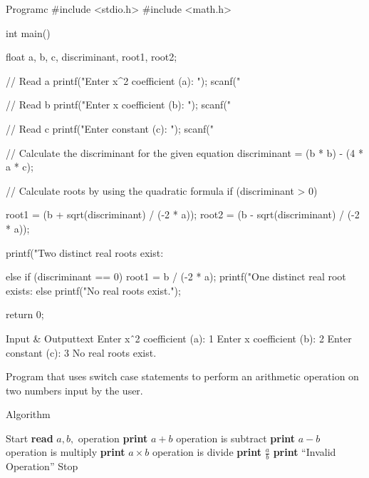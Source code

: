 \documentclass[11pt]{ipu-c}
\begin{document}
    \begin{code}
        {Program}{c}
#include <stdio.h>
#include <math.h>

int main() {
    float a, b, c, discriminant, root1, root2;

    // Read a
    printf("Enter x^2 coefficient (a): ");
    scanf("%

    // Read b
    printf("Enter x coefficient (b): ");
    scanf("%

    // Read c
    printf("Enter constant (c): ");
    scanf("%

    // Calculate the discriminant for the given equation
    discriminant = (b * b) - (4 * a * c);

    // Calculate roots by using the quadratic formula
    if (discriminant > 0) {
        root1 = (b + sqrt(discriminant) / (-2 * a));
        root2 = (b - sqrt(discriminant) / (-2 * a));

        printf("Two distinct real roots exist:\n%
    } else if (discriminant == 0) {
        root1 = b / (-2 * a);
        printf("One distinct real root exists:\n%
    } else {
        printf("No real roots exist.");
    }

    return 0;
}
    \end{code}
    \begin{code}
        {Input \& Output}{text}
Enter xˆ2 coefficient (a): 1
Enter x coefficient (b): 2
Enter constant (c): 3
No real roots exist.
    \end{code}

    {Program that uses switch case statements to perform an arithmetic operation on two numbers input by the user.}

    \begin{tabularsection}{Algorithm}
        \begin{algorithmic}[1]
            \State Start
            \State \textbf{read} $a, b,$ operation
                \State \textbf{print} $a + b$
            \ElsIf
                    {operation is subtract}
                \State \textbf{print} $a - b$
            \ElsIf
                    {operation is multiply}
                \State \textbf{print} $a \times b$
            \ElsIf
                    {operation is divide}
                \State \textbf{print} $\frac{a}{b}$
            \Else
                \State \textbf{print} ``Invalid Operation''
            \EndIf
            \State Stop
        \end{algorithmic}
    \end{tabularsection}
\end{document}
